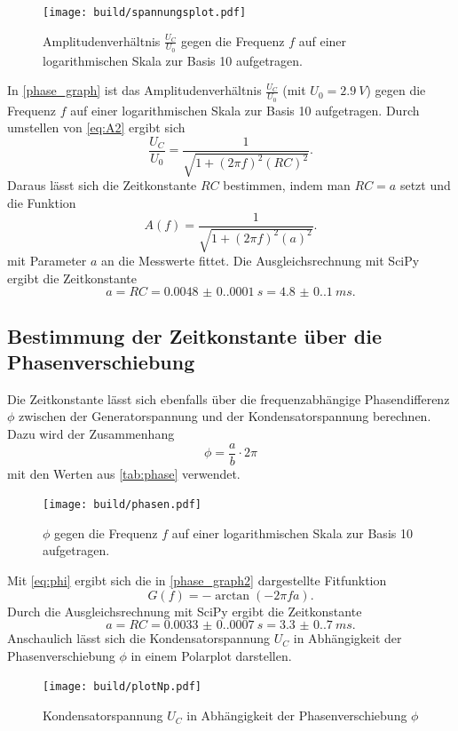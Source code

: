 \begin{figure}[H]
    \texttt{[image: build/spannungsplot.pdf]}
    \caption{Amplitudenverhältnis $\frac{U_C}{U_0}$ gegen die Frequenz $f$ auf einer logarithmischen Skala zur Basis 10 aufgetragen.}
    \label{phase_graph}
\end{figure} 
In \autoref{phase_graph} ist das Amplitudenverhältnis $\frac{U_C}{U_0}$ (mit $U_0 = \SI{2.9}{V}$) gegen die Frequenz $f$ auf einer logarithmischen Skala zur Basis 10 aufgetragen.
Durch umstellen von \autoref{eq:A2} ergibt sich
\begin{equation*}
    \frac{U_C}{U_0} = \frac{1}{\sqrt{1 + (2 \pi f)^2(RC)^2}}.
\end{equation*}
Daraus lässt sich die Zeitkonstante $RC$ bestimmen, indem man $RC = a$ setzt und die Funktion 
\begin{equation*}
    A(f) = \frac{1}{\sqrt{1 + (2 \pi f)^2(a)^2}}.
\end{equation*}
mit Parameter $a$ an die Messwerte fittet. 
Die Ausgleichsrechnung mit SciPy \cite{scipy} ergibt die Zeitkonstante
\begin{equation*}
    a = RC = \SI{0.0048(0.0001)}{s} = \SI{4.8(0.1)}{ms}.
\end{equation*}

\subsection{Bestimmung der Zeitkonstante über die Phasenverschiebung}
\label{sec:4.3}
Die Zeitkonstante lässt sich ebenfalls über die frequenzabhängige Phasendifferenz $\phi$ zwischen der Generatorspannung und der Kondensatorspannung berechnen.
Dazu wird der Zusammenhang
\begin{equation*}
    \phi = \frac{a}{b} \cdot 2 \pi
\end{equation*}
mit den Werten aus \autoref{tab:phase} verwendet.
\begin{figure}[H]
    \texttt{[image: build/phasen.pdf]}
    \caption{$\phi$ gegen die Frequenz $f$ auf einer logarithmischen Skala zur Basis 10 aufgetragen.}
    \label{phase_graph2}
\end{figure} 
Mit \autoref{eq:phi} ergibt sich die in \autoref{phase_graph2} dargestellte Fitfunktion
\begin{equation*}
    G(f) = -\arctan (-2 \pi f a).
\end{equation*}
Durch die Ausgleichsrechnung mit SciPy \cite{scipy} ergibt die Zeitkonstante
\begin{equation*}
    a = RC = \SI{0.0033(0.0007)}{s} = \SI{3.3(0.7)}{ms}.
\end{equation*}
Anschaulich lässt sich die Kondensatorspannung $U_C$ in Abhängigkeit der Phasenverschiebung $\phi$ in einem Polarplot darstellen.
\begin{figure}[H]
    \texttt{[image: build/plotNp.pdf]}
    \caption{Kondensatorspannung $U_C$ in Abhängigkeit der Phasenverschiebung $\phi$}
    \label{fig:phase_graph2}
\end{figure} 
\newpage
